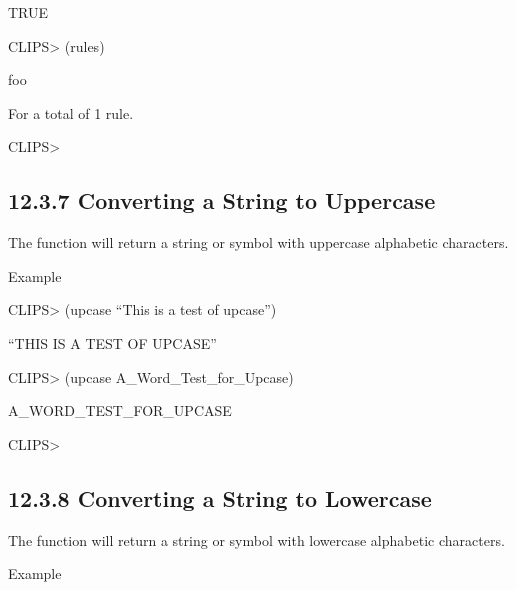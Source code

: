 \documentclass[letterpaper,10pt,english]{sphinxmanual}
\begin{document}
TRUE

CLIPS\textgreater{} (rules)

foo

For a total of 1 rule.

CLIPS\textgreater{}


\subsection{12.3.7 Converting a String to Uppercase}
\label{\detokenize{actions:converting-a-string-to-uppercase}}
The  function will return a string or symbol with uppercase
alphabetic characters.


\begin{sphinxVerbatim}[commandchars=\\\{\}]
 
\end{sphinxVerbatim}

Example

CLIPS\textgreater{} (upcase “This is a test of upcase”)

“THIS IS A TEST OF UPCASE”

CLIPS\textgreater{} (upcase A\_Word\_Test\_for\_Upcase)

A\_WORD\_TEST\_FOR\_UPCASE

CLIPS\textgreater{}


\subsection{12.3.8 Converting a String to Lowercase}
\label{\detokenize{actions:converting-a-string-to-lowercase}}
The  function will return a string or symbol with lowercase
alphabetic characters.


\begin{sphinxVerbatim}[commandchars=\\\{\}]
 
\end{sphinxVerbatim}

Example
\end{document}
